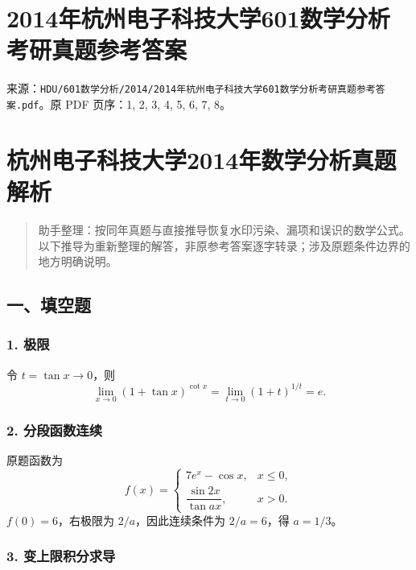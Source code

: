\documentclass[11pt,fontset=fandol]{ctexart}
\begin{document}
\section{2014年杭州电子科技大学601数学分析考研真题参考答案}\label{ux5e74ux676dux5ddeux7535ux5b50ux79d1ux6280ux5927ux5b66601ux6570ux5b66ux5206ux6790ux8003ux7814ux771fux9898ux53c2ux8003ux7b54ux6848}

来源：\texttt{HDU/601数学分析/2014/2014年杭州电子科技大学601数学分析考研真题参考答案.pdf}。原
PDF 页序：1, 2, 3, 4, 5, 6, 7, 8。

\section{杭州电子科技大学2014年数学分析真题解析}\label{ux676dux5ddeux7535ux5b50ux79d1ux6280ux5927ux5b662014ux5e74ux6570ux5b66ux5206ux6790ux771fux9898ux89e3ux6790}

\begin{quote}
助手整理：按同年真题与直接推导恢复水印污染、漏项和误识的数学公式。以下推导为重新整理的解答，非原参考答案逐字转录；涉及原题条件边界的地方明确说明。
\end{quote}

\subsection{一、填空题}\label{ux4e00ux586bux7a7aux9898}

\subsubsection{1. 极限}\label{ux6781ux9650}

令 \(t=\tan x\to0\)，则 \[
\boxed{\lim_{x\to0}(1+\tan x)^{\cot x}
=\lim_{t\to0}(1+t)^{1/t}=e.}
\]

\subsubsection{2.
分段函数连续}\label{ux5206ux6bb5ux51fdux6570ux8fdeux7eed}

原题函数为 \[
f(x)=\begin{cases}7e^x-\cos x,&x\leq0,\\\dfrac{\sin2x}{\tan ax},&x>0.\end{cases}
\] \(f(0)=6\)，右极限为 \(2/a\)，因此连续条件为 \(2/a=6\)，得
\(\boxed{a=1/3}\)。

\subsubsection{3.
变上限积分求导}\label{ux53d8ux4e0aux9650ux79efux5206ux6c42ux5bfc}
\end{document}
